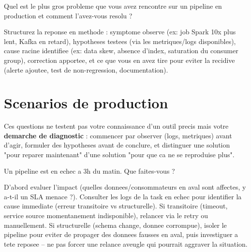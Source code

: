 \documentclass[11pt,a4paper]{article}
\begin{document}
\begin{question} Quel est le plus gros probleme que vous avez rencontre sur un pipeline en production et comment l'avez-vous resolu ?
\end{question}
\begin{reponse}
Structurez la reponse en methode : symptome observe (ex: job Spark 10x plus lent, Kafka en retard), hypotheses testees (via les metriques/logs disponibles), cause racine identifiee (ex: data skew, absence d'index, saturation du consumer group), correction apportee, et ce que vous en avez tire pour eviter la recidive (alerte ajoutee, test de non-regression, documentation).
\end{reponse}

\newpage
\section{Scenarios de production}

\begin{cle}
Ces questions ne testent pas votre connaissance d'un outil precis mais votre \textbf{demarche de diagnostic} : commencer par observer (logs, metriques) avant d'agir, formuler des hypotheses avant de conclure, et distinguer une solution "pour reparer maintenant" d'une solution "pour que ca ne se reproduise plus".
\end{cle}

\begin{question} Un pipeline est en echec a 3h du matin. Que faites-vous ?
\end{question}
\begin{reponse}
D'abord evaluer l'impact (quelles donnees/consommateurs en aval sont affectes, y a-t-il un SLA menace ?). Consulter les logs de la task en echec pour identifier la cause immediate (erreur transitoire vs structurelle). Si transitoire (timeout, service source momentanement indisponible), relancer via le retry ou manuellement. Si structurelle (schema change, donnee corrompue), isoler le pipeline pour eviter de propager des donnees fausses en aval, puis investiguer a tete reposee -- ne pas forcer une relance aveugle qui pourrait aggraver la situation.
\end{reponse}
\end{document}
